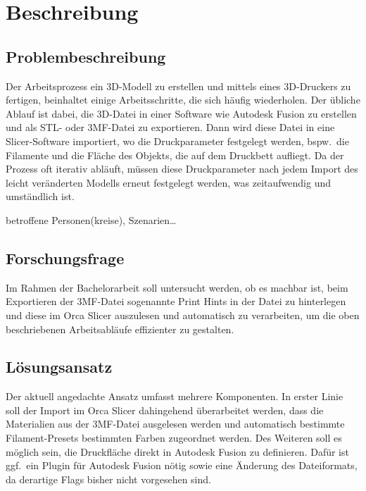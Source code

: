 \chapter{Beschreibung}\label{ch:data}

\section{Problembeschreibung}

Der Arbeitsprozess ein 3D-Modell zu erstellen und mittels eines 3D-Druckers zu fertigen, beinhaltet einige Arbeitsschritte, die sich h\"aufig wiederholen. 
Der \"ubliche Ablauf ist dabei, die 3D-Datei in einer Software wie Autodesk Fusion zu erstellen und als STL- oder 3MF-Datei zu exportieren.
Dann wird diese Datei in eine Slicer-Software importiert, wo die Druckparameter festgelegt werden, bspw.\ die Filamente und die Fl\"ache des Objekts, die auf dem Druckbett aufliegt. 
Da der Prozess oft iterativ abl\"auft, m\"ussen diese Druckparameter nach jedem Import des leicht ver\"anderten Modells erneut festgelegt werden, was zeitaufwendig und umst\"andlich ist.

betroffene Personen(kreise), Szenarien\dots

\section{Forschungsfrage}
Im Rahmen der Bachelorarbeit soll untersucht werden, ob es machbar ist, beim Exportieren der 3MF-Datei sogenannte Print Hints in der Datei zu hinterlegen und diese im Orca Slicer auszulesen und automatisch zu verarbeiten, um die oben beschriebenen Arbeitsabläufe effizienter zu gestalten.

\section{Lösungsansatz}
Der aktuell angedachte Ansatz umfasst mehrere Komponenten. 
In erster Linie soll der Import im Orca Slicer dahingehend \"uberarbeitet werden, dass die Materialien aus der 3MF-Datei ausgelesen werden und automatisch bestimmte Filament-Presets bestimmten Farben zugeordnet werden. %
Des Weiteren soll es m\"oglich sein, die Druckfl\"ache direkt in Autodesk Fusion zu definieren. 
Daf\"ur ist ggf.\ ein Plugin f\"ur Autodesk Fusion n\"otig sowie eine \"Anderung des Dateiformats, da derartige Flags bisher nicht vorgesehen sind.

